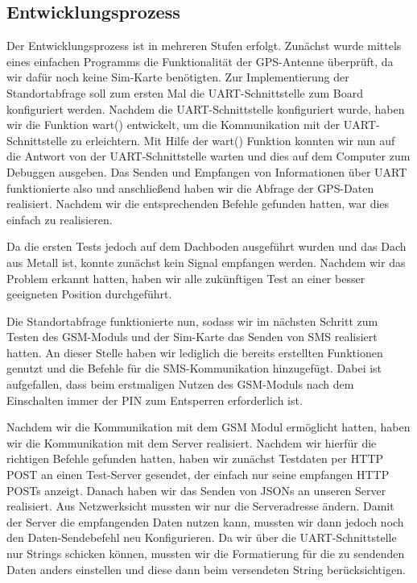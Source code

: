 \subsection{Entwicklungsprozess}
Der Entwicklungsprozess ist in mehreren Stufen erfolgt. 
Zunächst wurde mittels eines einfachen Programms die Funktionalität der GPS-Antenne überprüft, da wir dafür noch keine Sim-Karte benötigten. Zur Implementierung der Standortabfrage soll zum ersten Mal die UART-Schnittstelle zum Board konfiguriert werden. Nachdem die UART-Schnittstelle konfiguriert wurde, haben wir die Funktion wart() entwickelt, um die Kommunikation mit der UART-Schnittstelle zu erleichtern. Mit Hilfe der wart() Funktion konnten wir nun auf die Antwort von der UART-Schnittstelle warten und dies auf dem Computer zum Debuggen ausgeben. Das Senden und Empfangen von Informationen über UART funktionierte also und anschließend haben wir die Abfrage der GPS-Daten realisiert. Nachdem wir die entsprechenden Befehle gefunden hatten, war dies einfach zu realisieren.

Da die ersten Tests jedoch auf dem Dachboden ausgeführt wurden und das Dach aus Metall ist, konnte zunächst kein Signal empfangen werden. Nachdem wir das Problem erkannt hatten, haben wir alle zukünftigen Test an einer besser geeigneten Position durchgeführt.

Die Standortabfrage funktionierte nun, sodass wir im nächsten Schritt zum Testen des GSM-Moduls und der Sim-Karte das Senden von SMS realisiert hatten. An dieser Stelle haben wir lediglich die bereits erstellten Funktionen genutzt und die Befehle für die SMS-Kommunikation hinzugefügt. Dabei ist aufgefallen, dass beim erstmaligen Nutzen des GSM-Moduls nach dem Einschalten immer der PIN zum Entsperren erforderlich ist. 

Nachdem wir die Kommunikation mit dem GSM Modul ermöglicht hatten, haben wir die Kommunikation mit dem Server realisiert.
Nachdem wir hierfür die richtigen Befehle gefunden hatten, haben wir zunächst Testdaten per HTTP POST an einen Test-Server gesendet, der einfach nur seine empfangen HTTP POSTs anzeigt. Danach haben wir das Senden von JSONs an unseren Server realisiert. Aus Netzwerksicht mussten wir nur die Serveradresse ändern.  Damit der Server die empfangenden Daten nutzen kann, mussten wir dann jedoch noch den Daten-Sendebefehl neu Konfigurieren. Da wir über die UART-Schnittstelle nur Strings schicken können, mussten wir die Formatierung für die zu sendenden Daten anders einstellen und diese  dann beim versendeten String berücksichtigen. 

